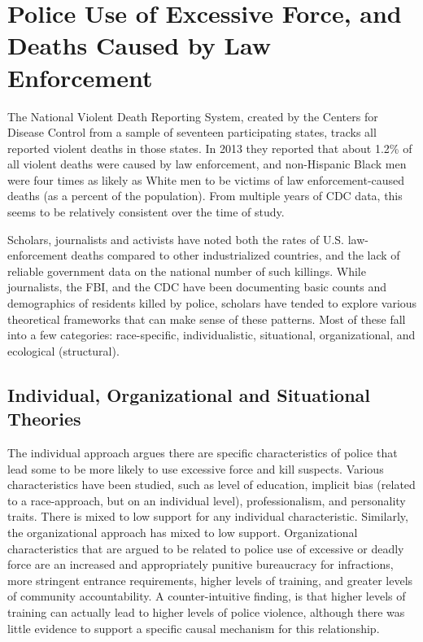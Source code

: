 \documentclass[sigconf]{acmart}
\begin{document}
\section{Police Use of Excessive Force, and Deaths Caused by Law Enforcement}
The National Violent Death Reporting System, created by the Centers for Disease Control from a sample of seventeen participating states, tracks all reported violent deaths in those states.  In 2013 they reported that about 1.2\% of all violent deaths were caused by law enforcement, and non-Hispanic Black men were four times as likely as White men to be victims of law enforcement-caused deaths (as a percent of the population). \cite{cdc13}  From multiple years of CDC data, this seems to be relatively consistent over the time of study.  

Scholars, journalists and activists have noted both the rates of U.S. law-enforcement deaths compared to other industrialized countries, and the lack of reliable government data on the national number of such killings. \cite{currie16,pridemore05,dalton17,lartey15,ser16}  While journalists, the FBI, and the CDC have been documenting basic counts and demographics of residents killed by police, scholars have tended to explore various theoretical frameworks that can make sense of these patterns.  Most of these fall into a few categories: race-specific, individualistic, situational, organizational, and ecological (structural). \cite{nix17,provine11,smith14,chaney13}

\subsection{Individual, Organizational and Situational Theories}
The individual approach argues there are specific characteristics of police that lead some to be more likely to use excessive force and kill suspects.  Various characteristics have been studied, such as level of education, implicit bias (related to a race-approach, but on an individual level), professionalism, and personality traits. \cite{nix17,smith04}  There is mixed to low support for any individual characteristic.  Similarly, the organizational approach has mixed to low support.  Organizational characteristics that are argued to be related to police use of excessive or deadly force are an increased and appropriately punitive bureaucracy for infractions, more stringent entrance requirements, higher levels of training, and greater levels of community accountability. \cite{nix17,smith04,smith14} A counter-intuitive finding, is that higher levels of training can actually lead to higher levels of police violence, although there was little evidence to support a specific causal mechanism for this relationship.  \cite{smith14}
\end{document}
